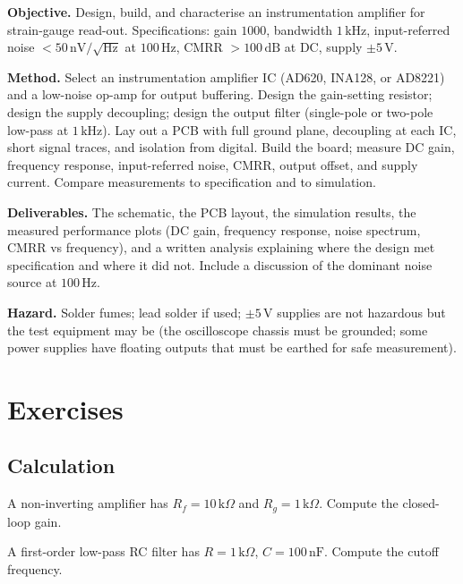 \begin{project}
\textbf{Objective.} Design, build, and characterise an instrumentation amplifier for strain-gauge read-out. Specifications: gain $1000$, bandwidth $1\,\text{kHz}$, input-referred noise $< 50\,\text{nV}/\sqrt{\text{Hz}}$ at $100\,\text{Hz}$, CMRR $> 100\,\text{dB}$ at DC, supply $\pm 5\,\text{V}$.

\textbf{Method.} Select an instrumentation amplifier IC (AD620, INA128, or AD8221) and a low-noise op-amp for output buffering. Design the gain-setting resistor; design the supply decoupling; design the output filter (single-pole or two-pole low-pass at $1\,\text{kHz}$). Lay out a PCB with full ground plane, decoupling at each IC, short signal traces, and isolation from digital. Build the board; measure DC gain, frequency response, input-referred noise, CMRR, output offset, and supply current. Compare measurements to specification and to simulation.

\textbf{Deliverables.} The schematic, the PCB layout, the simulation results, the measured performance plots (DC gain, frequency response, noise spectrum, CMRR vs frequency), and a written analysis explaining where the design met specification and where it did not. Include a discussion of the dominant noise source at $100\,\text{Hz}$.

\textbf{Hazard.} Solder fumes; lead solder if used; $\pm 5\,\text{V}$ supplies are not hazardous but the test equipment may be (the oscilloscope chassis must be grounded; some power supplies have floating outputs that must be earthed for safe measurement).
\end{project}

\section{Exercises}

\subsection*{Calculation}

\begin{exercise}
A non-inverting amplifier has $R_f = 10\,\text{k}\Omega$ and $R_g = 1\,\text{k}\Omega$. Compute the closed-loop gain.
\end{exercise}

\begin{exercise}
A first-order low-pass RC filter has $R = 1\,\text{k}\Omega$, $C = 100\,\text{nF}$. Compute the cutoff frequency.
\end{exercise}

